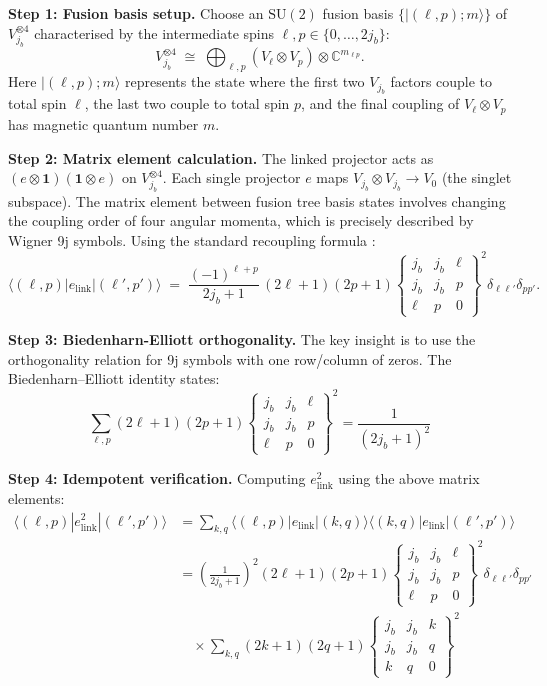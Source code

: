 \documentclass[11pt]{article}
\begin{document}
\textbf{Step 1: Fusion basis setup.}
Choose an $\mathrm{SU}(2)$ fusion basis
$\{|(\ell,p);m\rangle\}$ of
$V_{j_b}^{\otimes4}$ characterised by the intermediate spins
$\ell,p\in\{0,\dots,2j_b\}$:
\[
  V_{j_b}^{\otimes4}
  \;\cong\;
  \bigoplus_{\ell,p}(V_{\ell}\otimes V_{p})\otimes\mathbb C^{m_{\ell p}}.
\]
Here $|(\ell,p);m\rangle$ represents the state where the first two $V_{j_b}$
factors couple to total spin $\ell$, the last two couple to total spin $p$,
and the final coupling of $V_\ell \otimes V_p$ has magnetic quantum number $m$.

\textbf{Step 2: Matrix element calculation.}
The linked projector acts as $(e\otimes\mathbf{1})(\mathbf{1}\otimes e)$ on $V_{j_b}^{\otimes 4}$.
Each single projector $e$ maps $V_{j_b}\otimes V_{j_b} \to V_0$ (the singlet subspace).
The matrix element between fusion tree basis states involves changing the coupling
order of four angular momenta, which is precisely described by Wigner 9j symbols.
Using the standard recoupling formula \cite[Eq.\,(3.9)]{Varshalovich1988}:
\[
  \langle(\ell,p)|e_{\text{link}}|(\ell',p')\rangle
  \;=\;
  \frac{(-1)^{\ell+p}}{2j_b+1}
  \,(2\ell+1)(2p+1)
  \begin{Bmatrix}
    j_b & j_b & \ell\\
    j_b & j_b & p\\
    \ell & p & 0
  \end{Bmatrix}^2
  \delta_{\ell\ell'}\delta_{pp'}.
\]

\textbf{Step 3: Biedenharn-Elliott orthogonality.}
The key insight is to use the orthogonality relation for 9j symbols with one
row/column of zeros. The Biedenharn–Elliott identity \cite[Eq.\,(10.4.4)]{BiedenharnLouck}
states:
\[
  \sum_{\ell,p} (2\ell+1)(2p+1)
  \begin{Bmatrix} j_b & j_b & \ell \\ j_b & j_b & p \\ \ell & p & 0
  \end{Bmatrix}^2 = \frac{1}{(2j_b+1)^2}
\]

\textbf{Step 4: Idempotent verification.}
Computing $e_{\text{link}}^2$ using the above matrix elements:
\begin{align}
  \langle(\ell,p)|e_{\text{link}}^2|(\ell',p')\rangle
  &= \sum_{k,q} \langle(\ell,p)|e_{\text{link}}|(k,q)\rangle \langle(k,q)|e_{\text{link}}|(\ell',p')\rangle \\
  &= \left(\frac{1}{2j_b+1}\right)^2 (2\ell+1)(2p+1)
  \begin{Bmatrix} j_b & j_b & \ell \\ j_b & j_b & p \\ \ell & p & 0
  \end{Bmatrix}^2 \delta_{\ell\ell'}\delta_{pp'} \\
  &\quad \times \sum_{k,q} (2k+1)(2q+1)
  \begin{Bmatrix} j_b & j_b & k \\ j_b & j_b & q \\ k & q & 0
  \end{Bmatrix}^2
\end{align}
\end{document}
